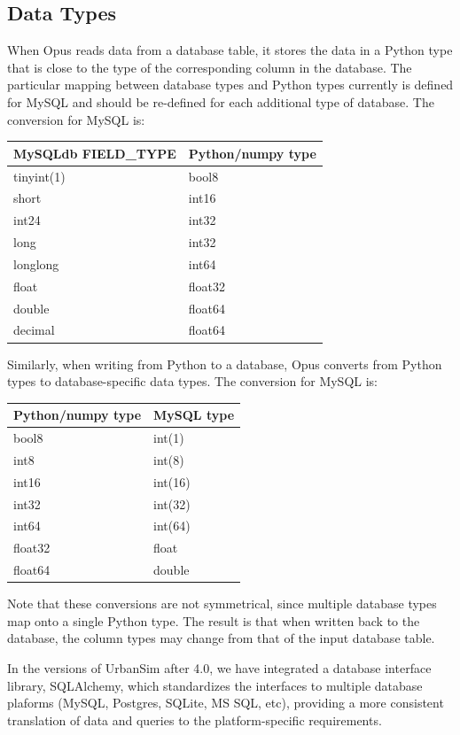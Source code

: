 \subsection{Data Types}

   When Opus reads data from a database table, it stores the
data in a Python type that is close to the type of the corresponding
column in the database.  The particular mapping between database
types and Python types currently is defined for MySQL
and should be re-defined for each additional type of database.  The
conversion for MySQL is:

\begin{tabular}{ll}
MySQLdb FIELD_TYPE & Python/numpy type \\
\hline
tinyint(1) & bool8 \\
short & int16 \\
int24 & int32 \\
long & int32 \\
longlong & int64 \\
float & float32 \\
double & float64 \\
decimal & float64 \\
\end{tabular}

Similarly, when writing from Python to a database, Opus converts from Python
types to database-specific data types.  The conversion for MySQL is:

\begin{tabular}{ll}
Python/numpy type & MySQL type \\
\hline
bool8 & int(1) \\
int8 & int(8) \\
int16 & int(16) \\
int32 & int(32) \\
int64 & int(64) \\
float32 & float \\
float64 & double \\
\end{tabular}

Note that these conversions are not symmetrical, since multiple
database types map onto a single Python type.  The result is that
when written back to the database, the column types may change from
that of the input database table.

In the versions of UrbanSim after 4.0, we have integrated a database
interface library, SQLAlchemy, which standardizes the interfaces to
multiple database plaforms (MySQL, Postgres, SQLite, MS SQL, etc),
providing a more consistent translation of data and queries to the
platform-specific requirements. 

